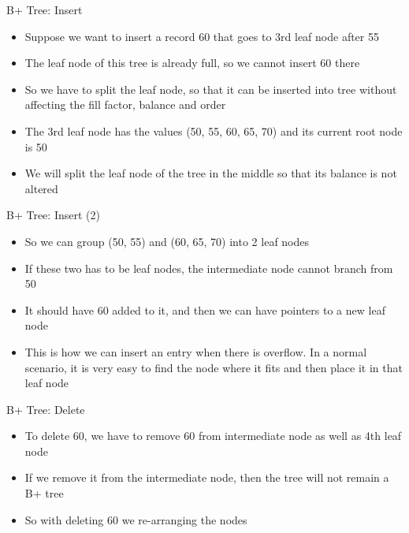 \documentclass[aspectratio=169, xcolor=dvipsnames]{beamer}
\begin{document}
\begin{frame}{B+ Tree: Insert}
    \begin{itemize}[<+->]
        \item Suppose we want to insert a record 60 that goes to 3rd leaf node after 55
        \item The leaf node of this tree is already full, so we cannot insert 60 there
        \item So we have to split the leaf node, so that it can be inserted into tree without affecting the fill factor, balance and order
        \item The 3rd leaf node has the values (50, 55, 60, 65, 70) and its current root node is 50
        \item We will split the leaf node of the tree in the middle so that its balance is not altered
    \end{itemize}
\end{frame}

\begin{frame}{B+ Tree: Insert (2)}
    \begin{itemize}[<+->]
        \item So we can group (50, 55) and (60, 65, 70) into 2 leaf nodes
        \item If these two has to be leaf nodes, the intermediate node cannot branch from 50
        \item It should have 60 added to it, and then we can have pointers to a new leaf node
        \item This is how we can insert an entry when there is overflow. In a normal scenario, it is very easy to find the node where it fits and then place it in that leaf node
    \end{itemize}
\end{frame}

\begin{frame}{B+ Tree: Delete}
    \begin{itemize}[<+->]
        \item To delete 60, we have to remove 60 from intermediate node as well as 4th leaf node
        \item If we remove it from the intermediate node, then the tree will not remain a B+ tree
        \item So with deleting 60 we re-arranging the nodes
    \end{itemize}
\end{frame}
\end{document}
